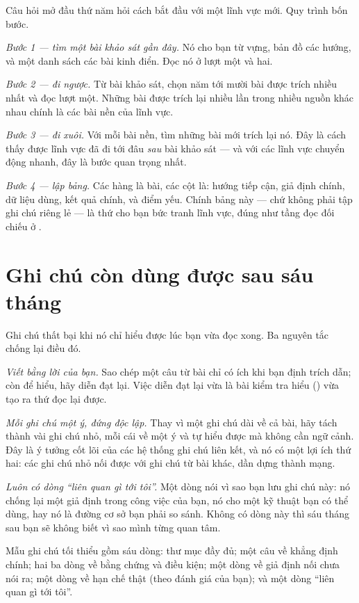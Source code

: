 \documentclass[../../english.tex]{subfiles}
\begin{document}
Câu hỏi mở đầu thứ năm hỏi cách bắt đầu với một lĩnh vực mới. Quy trình bốn bước.

\emph{Bước 1 --- tìm một bài khảo sát gần đây.} Nó cho bạn từ vựng, bản đồ các hướng, và một danh sách các bài kinh điển. Đọc nó ở lượt một và hai.

\emph{Bước 2 --- đi ngược.} Từ bài khảo sát, chọn năm tới mười bài được trích nhiều nhất và đọc lượt một. Những bài được trích lại nhiều lần trong nhiều nguồn khác nhau chính là các bài nền của lĩnh vực.

\emph{Bước 3 --- đi xuôi.} Với mỗi bài nền, tìm những bài mới trích lại nó. Đây là cách thấy được lĩnh vực đã đi tới đâu \emph{sau} bài khảo sát --- và với các lĩnh vực chuyển động nhanh, đây là bước quan trọng nhất.

\emph{Bước 4 --- lập bảng.} Các hàng là bài, các cột là: hướng tiếp cận, giả định chính, dữ liệu dùng, kết quả chính, và điểm yếu. Chính bảng này --- chứ không phải tập ghi chú riêng lẻ --- là thứ cho bạn bức tranh lĩnh vực, đúng như tầng đọc đối chiếu ở .

\section{Ghi chú còn dùng được sau sáu tháng}

Ghi chú thất bại khi nó chỉ hiểu được lúc bạn vừa đọc xong. Ba nguyên tắc chống lại điều đó.

\emph{Viết bằng lời của bạn.} Sao chép một câu từ bài chỉ có ích khi bạn định trích dẫn; còn để hiểu, hãy diễn đạt lại. Việc diễn đạt lại vừa là bài kiểm tra hiểu () vừa tạo ra thứ đọc lại được.

\emph{Mỗi ghi chú một ý, đứng độc lập.} Thay vì một ghi chú dài về cả bài, hãy tách thành vài ghi chú nhỏ, mỗi cái về một ý và tự hiểu được mà không cần ngữ cảnh. Đây là ý tưởng cốt lõi của các hệ thống ghi chú liên kết\cite{ahrens2017}, và nó có một lợi ích thứ hai: các ghi chú nhỏ nối được với ghi chú từ bài khác, dần dựng thành mạng.

\emph{Luôn có dòng ``liên quan gì tới tôi''.} Một dòng nói vì sao bạn lưu ghi chú này: nó chống lại một giả định trong công việc của bạn, nó cho một kỹ thuật bạn có thể dùng, hay nó là đường cơ sở bạn phải so sánh. Không có dòng này thì sáu tháng sau bạn sẽ không biết vì sao mình từng quan tâm.

Mẫu ghi chú tối thiểu gồm sáu dòng: thư mục đầy đủ; một câu về khẳng định chính; hai ba dòng về bằng chứng và điều kiện; một dòng về giả định nối chưa nói ra; một dòng về hạn chế thật (theo đánh giá của bạn); và một dòng ``liên quan gì tới tôi''.
\end{document}
